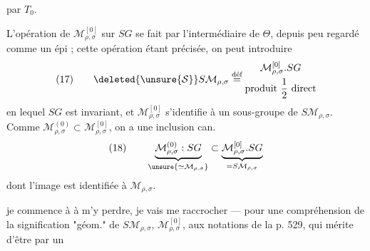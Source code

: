 

 par $T_0$. 

L'opération de $\mathcal M_{\rho,\sigma}^{[0]}$ sur $SG$ se fait
par l'intermédiaire de $\Theta$, depuis peu regardé comme un épi
;
cette opération étant précisée, on peut introduire
\[
(17)\qquad\deleted{\unsure{\mathcal S}}
S\mathcal M_{\rho,\sigma}\overset{\text{déf}}{=}
\begin{gathered}
\mathcal M_{\rho,\sigma}^{[0]}.SG\\
\text{produit }\frac12\text{ direct}
\end{gathered}
\]
en lequel $SG$ est invariant, et $\mathcal M_{\rho,\sigma}^{[0]}$ s'identifie
à un sous-groupe de $S\mathcal M_{\rho,\sigma}$. Comme
$\mathcal M_{\rho,\sigma}^{(0)}\subset\mathcal M_{\rho,\sigma}^{[0]}$,
on a une inclusion can.
\[
(18)\qquad
\underbrace{\mathcal M_{\rho,\sigma}^{(0)}:SG}_{\unsure{\simeq\mathcal M_{\rho,\sigma}}}
\subset
\underbrace{\mathcal M_{\rho,\sigma}^{[0]}.SG}_{=S\mathcal M_{\rho,\sigma}}
\]
dont l'image est 
identifiée à $\mathcal M_{\rho,\sigma}$.

 je commence à  à m'y perdre, je vais me raccrocher
--- pour une compréhension de la signification "géom." de
$S\mathcal M_{\rho,\sigma}$, $\mathcal M_{\rho,\sigma}^{[0]}$, aux notations
de la p. 529, qui mérite d'être  par un



